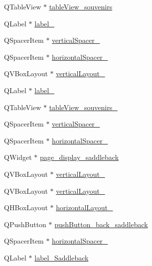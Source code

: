 \begin{DoxyCompactItemize}
\item 
Q\+Table\+View $\ast$ \hyperlink{class_ui___main_window_a6ec56935dc4eace1603ba5789bc78a6e}{table\+View\+\_\+souvenirs}
\item 
Q\+Label $\ast$ \hyperlink{class_ui___main_window_a0e90c7e9ad77386881e0b264ddb9dd22}{label\+\_}
\item 
Q\+Spacer\+Item $\ast$ \hyperlink{class_ui___main_window_a9d4bfb2fa0d87ccf9f7a311116676be6}{vertical\+Spacer\+\_}
\item 
Q\+Spacer\+Item $\ast$ \hyperlink{class_ui___main_window_a79d9abb425faf54115e540fab7bd1a14}{horizontal\+Spacer\+\_}
\item 
Q\+V\+Box\+Layout $\ast$ \hyperlink{class_ui___main_window_aaa8cc393d5a44562d629a9f646d2c6dd}{vertical\+Layout\+\_}
\item 
Q\+Label $\ast$ \hyperlink{class_ui___main_window_a2e2516d755e4dd53fc905dabddf2738a}{label\+\_}
\item 
Q\+Table\+View $\ast$ \hyperlink{class_ui___main_window_ab17d8e09df1063c48574cbba0a23936e}{table\+View\+\_\+souvenirs\+\_}
\item 
Q\+Spacer\+Item $\ast$ \hyperlink{class_ui___main_window_a298e82ba0cc2500cd61f393f493e4529}{vertical\+Spacer\+\_}
\item 
Q\+Spacer\+Item $\ast$ \hyperlink{class_ui___main_window_a803124d27002591fb6919fa2064312a6}{horizontal\+Spacer\+\_}
\item 
Q\+Widget $\ast$ \hyperlink{class_ui___main_window_ab6ecf84cdd5499b5a37eff9a6e8e0a22}{page\+\_\+display\+\_\+saddleback}
\item 
Q\+V\+Box\+Layout $\ast$ \hyperlink{class_ui___main_window_a93c190b085c63a667c535ba0bbcfec7c}{vertical\+Layout\+\_}
\item 
Q\+V\+Box\+Layout $\ast$ \hyperlink{class_ui___main_window_afcc20a3d5058037a00cdc6122f231848}{vertical\+Layout\+\_}
\item 
Q\+H\+Box\+Layout $\ast$ \hyperlink{class_ui___main_window_a03ce63974cc69b067c91bbf285cceca8}{horizontal\+Layout\+\_}
\item 
Q\+Push\+Button $\ast$ \hyperlink{class_ui___main_window_a0dc9dec4c77b80c81799e3b13193538f}{push\+Button\+\_\+back\+\_\+saddleback}
\item 
Q\+Spacer\+Item $\ast$ \hyperlink{class_ui___main_window_a4fc05b11984637298795a354792c4023}{horizontal\+Spacer\+\_}
\item 
Q\+Label $\ast$ \hyperlink{class_ui___main_window_a3cf5125f980d9e56a19b83495e094de2}{label\+\_\+\+Saddleback}

\end{DoxyCompactItemize}
